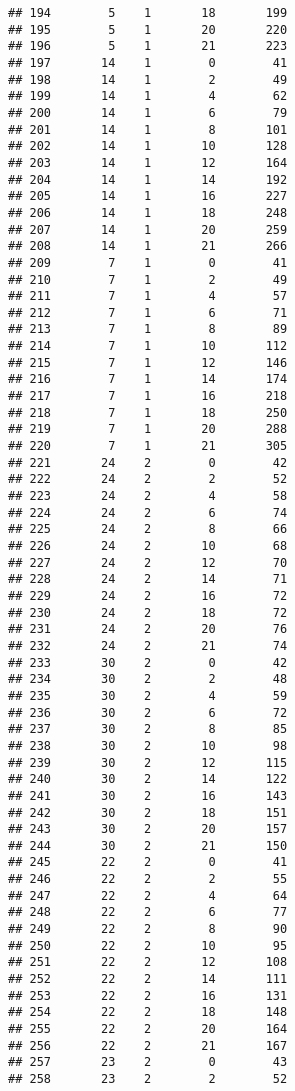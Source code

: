 \documentclass[
]{article}
\begin{document}
\begin{verbatim}
## 194        5    1       18       199
## 195        5    1       20       220
## 196        5    1       21       223
## 197       14    1        0        41
## 198       14    1        2        49
## 199       14    1        4        62
## 200       14    1        6        79
## 201       14    1        8       101
## 202       14    1       10       128
## 203       14    1       12       164
## 204       14    1       14       192
## 205       14    1       16       227
## 206       14    1       18       248
## 207       14    1       20       259
## 208       14    1       21       266
## 209        7    1        0        41
## 210        7    1        2        49
## 211        7    1        4        57
## 212        7    1        6        71
## 213        7    1        8        89
## 214        7    1       10       112
## 215        7    1       12       146
## 216        7    1       14       174
## 217        7    1       16       218
## 218        7    1       18       250
## 219        7    1       20       288
## 220        7    1       21       305
## 221       24    2        0        42
## 222       24    2        2        52
## 223       24    2        4        58
## 224       24    2        6        74
## 225       24    2        8        66
## 226       24    2       10        68
## 227       24    2       12        70
## 228       24    2       14        71
## 229       24    2       16        72
## 230       24    2       18        72
## 231       24    2       20        76
## 232       24    2       21        74
## 233       30    2        0        42
## 234       30    2        2        48
## 235       30    2        4        59
## 236       30    2        6        72
## 237       30    2        8        85
## 238       30    2       10        98
## 239       30    2       12       115
## 240       30    2       14       122
## 241       30    2       16       143
## 242       30    2       18       151
## 243       30    2       20       157
## 244       30    2       21       150
## 245       22    2        0        41
## 246       22    2        2        55
## 247       22    2        4        64
## 248       22    2        6        77
## 249       22    2        8        90
## 250       22    2       10        95
## 251       22    2       12       108
## 252       22    2       14       111
## 253       22    2       16       131
## 254       22    2       18       148
## 255       22    2       20       164
## 256       22    2       21       167
## 257       23    2        0        43
## 258       23    2        2        52

\end{verbatim}
\end{document}
